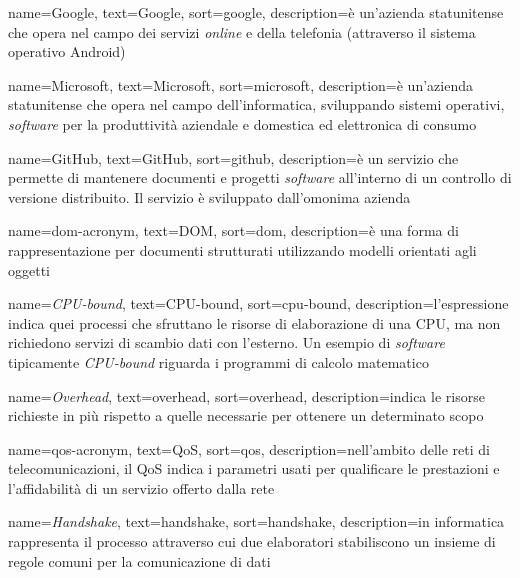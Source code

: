 {
  name=Google,
  text=Google,
  sort=google,
  description={è un'azienda statunitense che opera nel campo dei servizi \emph{online} e della telefonia (attraverso il sistema operativo Android)}
}

{
  name=Microsoft,
  text=Microsoft,
  sort=microsoft,
  description={è un'azienda statunitense che opera nel campo dell'informatica, sviluppando sistemi operativi, \emph{software} per la produttività aziendale e domestica ed elettronica di consumo}
}

{
  name=GitHub,
  text=GitHub,
  sort=github,
  description={è un servizio che permette di mantenere documenti e progetti \emph{software} all'interno di un controllo di versione distribuito. Il servizio è sviluppato dall'omonima azienda}
}

{
  name=\gls{dom-acronym},
  text=DOM,
  sort=dom,
  description={è una forma di rappresentazione per documenti strutturati utilizzando modelli orientati agli oggetti}
}

{
  name=\emph{CPU-bound},
  text=CPU-bound,
  sort=cpu-bound,
  description={l'espressione indica quei processi che sfruttano le risorse di elaborazione di una CPU, ma non richiedono servizi di scambio dati con l'esterno. Un esempio di \emph{software} tipicamente \emph{CPU-bound} riguarda i programmi di calcolo matematico}
}

{
  name=\emph{Overhead},
  text=overhead,
  sort=overhead,
  description={indica le risorse richieste in più rispetto a quelle necessarie per ottenere un determinato scopo}
}

{
  name=\gls{qos-acronym},
  text=QoS,
  sort=qos,
  description={nell'ambito delle reti di telecomunicazioni, il QoS indica i parametri usati per qualificare le prestazioni e l'affidabilità di un servizio offerto dalla rete}
}

{
  name=\emph{Handshake},
  text=handshake,
  sort=handshake,
  description={in informatica rappresenta il processo attraverso cui due elaboratori stabiliscono un insieme di regole comuni per la comunicazione di dati}
}
